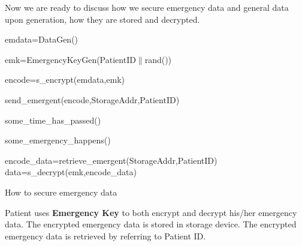 \documentclass[]{scrartcl}
\theoremstyle{definition}
\begin{document}
Now we are ready to discuss how we secure emergency data and general data upon generation, how they are stored and decrypted.

\begin{algorithm}[H]
\SetAlgoLined
{}

	emdata=DataGen()\;

	emk=EmergencyKeyGen(PatientID$\|$rand())\;

	encode=s\_encrypt(emdata,emk)\;

	send\_emergent(encode,StorageAddr,PatientID)\;

	some\_time\_has\_passed()\;

	some\_emergency\_happens()\;

	encode\_data=retrieve\_emergent(StorageAddr,PatientID)\;
	data=s\_decrypt(emk,encode\_data)\;



\caption{How to secure emergency data}

\end{algorithm}


Patient uses \textbf{Emergency Key} to both encrypt and decrypt his/her emergency data. The encrypted emergency data is stored in storage device. The encrypted emergency data is retrieved by referring to Patient ID.
\end{document}
